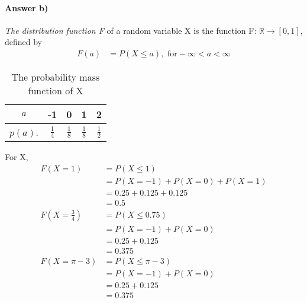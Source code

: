 \documentclass[11pt]{article} %
\begin{document}
\paragraph*{\bf Answer b)} {\em The distribution function F} of a random variable X is the function F: $\mathbb{R} \rightarrow [0, 1]$, defined by
\begin{align*}
F(a) & = P(X\leq a), \text{ for}  -\infty < a < \infty
\end{align*} 

\begin{table}[h!]
\begin{center}
\begin{tabular}{c|cccc} \hline
$a$ & -1 & 0 & 1 & 2 \\ \hline
$p(a)$. & $\frac{1}{4}$ & $\frac{1}{8}$ & $\frac{1}{8}$ & $\frac{1}{2}$ \\ \hline
\end{tabular}
\caption{The probability mass function of X}
\label{ta1}
\end{center}
\end{table}

For X, 
\begin{align*}
F(X=1) & = P(X\leq 1) \\
& = P(X=-1) + P(X=0) + P(X=1) \\
& = 0.25 + 0.125 + 0.125 \\
& = 0.5 \\
F(X=\frac{3}{4}) & = P(X\leq 0.75) \\
&= P(X=-1) + P(X=0) \\
& = 0.25 + 0.125  \\
& = 0.375 \\
F(X=\pi - 3) & = P(X\leq \pi -3) \\
&= P(X=-1) + P(X=0)  \\
& = 0.25 + 0.125 \\
& = 0.375
\end{align*}
\end{document}
